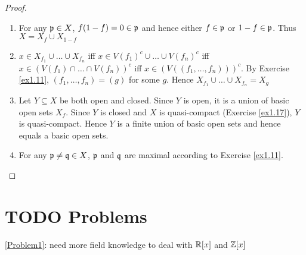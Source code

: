 \documentclass[11pt]{article}
\begin{document}
\begin{proof}
\begin{enumerate}
\item For any \(\mathfrak{p}\in X\), \(f(1-f)=0\in\mathfrak{p}\) and hence either \(f\in\mathfrak{p}\) or \(1-f\in\mathfrak{p}\). Thus \(X=X_f\cup X_{1-f}\)
\item \(x\in X_{f_1}\cup\dots\cup X_{f_n}\) iff \(x\in V(f_1)^c\cup\dots\cup V(f_n)^c\) iff \(x\in(V(f_1)\cap\dots\cap V(f_n))^c\) iff
\(x\in(V((f_1,\dots,f_n)))^c\). By Exercise \ref{ex1.11}, \((f_1,\dots,f_n)=(g)\) for some \(g\).
Hence \(X_{f_1}\cup\dots\cup X_{f_n}=X_g\)
\item Let \(Y\subseteq X\) be both open and closed. Since \(Y\) is open, it is a union of basic open
sets \(X_f\). Since \(Y\) is closed and \(X\) is quasi-compact (Exercise \ref{ex1.17}), \(Y\)
is quasi-compact. Hence \(Y\) is a finite union of basic open sets and hence equals a basic
open sets.
\item For any \(\mathfrak{p}\neq\mathfrak{q}\in X\), \(\mathfrak{p}\) and \(\mathfrak{q}\) are maximal according to Exercise \ref{ex1.11}.
\end{enumerate}
\end{proof}
\section{{\bfseries\sffamily TODO} Problems}
\label{sec:org0affd1c}
\ref{Problem1}: need more field knowledge to deal with \(\mathbb{R}[x]\) and \(\mathbb{Z}[x]\)
\end{document}
